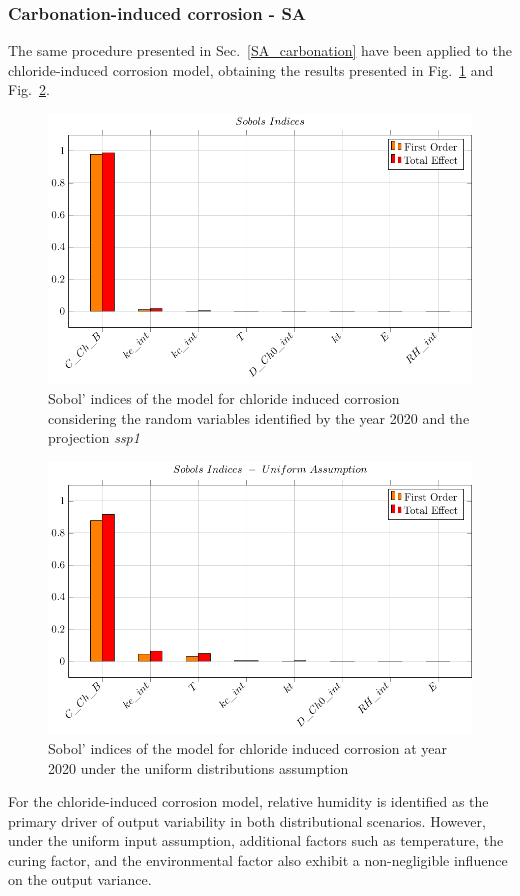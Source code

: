 \subsubsection{Carbonation-induced corrosion - SA}
The same procedure presented in Sec.~\ref{SA_carbonation} have been applied to the chloride-induced corrosion model, obtaining the results presented in Fig.~\ref{Sobol_ch_2020ssp1} and Fig.~\ref{Sobol_ch_2020uniform}.
\begin{figure}[H]
    \centering
    \includegraphics[width=0.8\linewidth]{imgs/pdfs/sobols_indices/chloride/19_sobols_withRH_2020_ssp1.pdf}
    \caption{Sobol' indices of the model for chloride induced corrosion considering the random variables identified by the year 2020 and the projection \textit{ssp1}}\label{Sobol_ch_2020ssp1}
\end{figure}

\begin{figure}[H]
    \centering
    \includegraphics[width=0.8\linewidth]{imgs/pdfs/sobols_indices/chloride/18_sobols_withRH_uniform_2020.pdf}
    \caption{Sobol' indices of the model for chloride induced corrosion at year 2020 under the uniform distributions assumption}\label{Sobol_ch_2020uniform}
\end{figure}
For the chloride-induced corrosion model, relative humidity is identified as the primary driver of output variability in both distributional scenarios. However, under the uniform input assumption, additional factors such as temperature, the curing factor, and the environmental factor also exhibit a non-negligible influence on the output variance.

